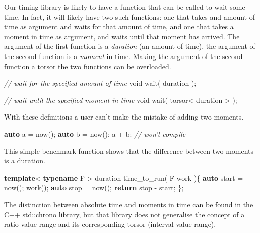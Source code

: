 \documentclass[]{article}
\newenvironment{Shaded}{}{}
\newcommand{\CommentTok}[1]{\textcolor[rgb]{0.38,0.63,0.69}{\textit{#1}}}
\newcommand{\ControlFlowTok}[1]{\textcolor[rgb]{0.00,0.44,0.13}{\textbf{#1}}}
\newcommand{\DataTypeTok}[1]{\textcolor[rgb]{0.56,0.13,0.00}{#1}}
\newcommand{\KeywordTok}[1]{\textcolor[rgb]{0.00,0.44,0.13}{\textbf{#1}}}
\newcommand{\NormalTok}[1]{#1}
\begin{document}
Our timing library is likely to have a function that can be called to
wait some time. In fact, it will likely have two such functions: one
that takes and amount of time as argument and waits for that amount of
time, and one that takes a moment in time as argument, and waits until
that moment has arrived. The argument of the first function is a
\emph{duration} (an amount of time), the argument of the second function
is a \emph{moment} in time. Making the argument of the second function a
torsor the two functions can be overloaded.

\begin{Shaded}
\begin{Highlighting}[]
\CommentTok{// wait for the specified amount of time}
\DataTypeTok{void}\NormalTok{ wait( duration ); }

\CommentTok{// wait until the specified moment in time}
\DataTypeTok{void}\NormalTok{ wait( torsor< duration > );}
\end{Highlighting}
\end{Shaded}

With these definitions a user can't make the mistake of adding two
moments.

\begin{Shaded}
\begin{Highlighting}[]
\KeywordTok{auto}\NormalTok{ a = now();}
\KeywordTok{auto}\NormalTok{ b = now();}
\NormalTok{a + b: }\CommentTok{// won't compile}
\end{Highlighting}
\end{Shaded}

This simple benchmark function shows that the difference between two
moments is a duration.

\begin{Shaded}
\begin{Highlighting}[]
\KeywordTok{template}\NormalTok{< }\KeywordTok{typename}\NormalTok{ F >}
\NormalTok{duration time_to_run( F work )\{}
   \KeywordTok{auto}\NormalTok{ start = now();}
\NormalTok{   work();}
   \KeywordTok{auto}\NormalTok{ stop = now();}
   \ControlFlowTok{return}\NormalTok{ stop - start;}
\NormalTok{\};   }
\end{Highlighting}
\end{Shaded}

The distinction between absolute time and moments in time can be found
in the C++ \href{https://en.cppreference.com/w/cpp/chrono}{std::chrono}
library, but that library does not generalise the concept of a ratio
value range and its corresponding torsor (interval value range).
\end{document}
